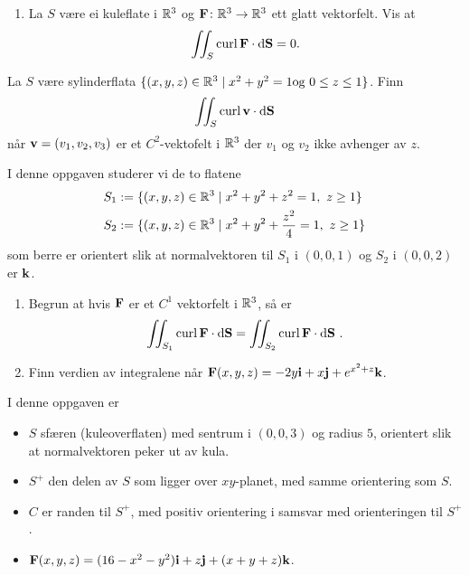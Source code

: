


\oppgave[V2017, Oppgave 5]

\begin{enumerate}
  \item La $S$ være ei kuleflate i $\mathbb{R}^3$ og $\mathbf{F} \colon \mathbb{R}^3 \to \mathbb{R}^3$ ett
    glatt vektorfelt. Vis at
    \begin{equation*}
     \iint_S \operatorname{curl} \mathbf{F} \cdot \mathop{}\! \mathrm{d} \mathbf{S}\mathop{}\! = 0.
    \end{equation*}
\end{enumerate}


\oppgave[V2015, Oppgave 9]

La $S$ være sylinderflata $\{(x,y,z) \in \mathbb{R}^3 \mid x^2 + y^2 = 1 \text{og} \ 0
\leq z \leq 1\}$. Finn
%
\begin{equation*}
  \iint_S \operatorname{curl} \mathbf{v} \cdot \mathop{}\! \mathrm{d} \mathbf{S}\mathop{}\!
\end{equation*}
%
når $\mathbf{v} = (v_1, v_2, v_3)$ er et $C^2$-vektofelt i $\mathbb{R}^3$ der  $v_1$ og
$v_2$ ikke avhenger av $z$.


\oppgave[K2014]

I denne oppgaven studerer vi de to flatene
%
\begin{align*}
  S_1 & := \{ (x,y,z) \in \R^3 \mid x^2 + y^2 + z^2 = 1, \ z \geq 1\} \\
  S_2 & := \{ (x,y,z) \in \R^3 \mid x^2 + y^2 + \frac{z^2}{4} = 1, \ z \geq 1\} 
\end{align*}
%
som berre er orientert slik at normalvektoren til $S_1$ i $(0,0,1)$ og $S_2$ i
$(0,0,2)$ er $\mathbf{k}$.

\begin{enumerate}
  \item Begrun at hvis $\mathbf{F}$ er et $C^1$ vektorfelt i $\mathbb{R}^3$, så er
    \begin{equation*}
      \iint_{S_1} \operatorname{curl} \mathbf{F} \cdot \mathop{}\! \mathrm{d} \mathbf{S}\mathop{}\! = \iint_{S_2} \operatorname{curl} \mathbf{F} \cdot \mathop{}\! \mathrm{d} \mathbf{S}\mathop{}\!\,.
    \end{equation*}
  \item Finn verdien av integralene når $\mathbf{F}(x,y,z) = -2y \mathbf{i} + x\mathbf{j} + e^{x^2+z}\mathbf{k}$.
\end{enumerate}

\oppgave[V2013, Oppgave 6] I denne oppgaven er

\begin{itemize}
  \item $S$ sfæren (kuleoverflaten) med sentrum i $(0,0,3)$ og radius $5$,
    orientert slik at normalvektoren peker ut av kula.
  \item $S^+$ den delen av $S$ som ligger over $xy$-planet, med samme
    orientering som $S$.
  \item $C$ er randen til $S^+$, med positiv orientering i samsvar med
    orienteringen til $S^+$.
  \item $\mathbf{F}(x,y,z) = (16 - x^2 - y^2)\mathbf{i} + z\mathbf{j} + (x + y + z)\mathbf{k}$.
\end{itemize}

